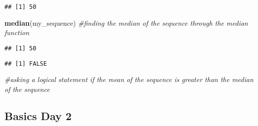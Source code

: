 \documentclass[]{article}
\newenvironment{Shaded}{\begin{snugshade}}{\end{snugshade}}
\newcommand{\CommentTok}[1]{\textcolor[rgb]{0.56,0.35,0.01}{\textit{#1}}}
\newcommand{\DataTypeTok}[1]{\textcolor[rgb]{0.13,0.29,0.53}{#1}}
\newcommand{\DecValTok}[1]{\textcolor[rgb]{0.00,0.00,0.81}{#1}}
\newcommand{\KeywordTok}[1]{\textcolor[rgb]{0.13,0.29,0.53}{\textbf{#1}}}
\newcommand{\NormalTok}[1]{#1}
\newcommand{\OperatorTok}[1]{\textcolor[rgb]{0.81,0.36,0.00}{\textbf{#1}}}
\newcommand{\StringTok}[1]{\textcolor[rgb]{0.31,0.60,0.02}{#1}}
\begin{document}
\begin{Shaded}
\end{Shaded}

\begin{verbatim}
## [1] 50
\end{verbatim}

\begin{Shaded}
\begin{Highlighting}[]
   \KeywordTok{median}\NormalTok{(my_sequence) }\CommentTok{#finding the median of the sequence through the median function}
\end{Highlighting}
\end{Shaded}

\begin{verbatim}
## [1] 50
\end{verbatim}

\begin{Shaded}
\end{Shaded}

\begin{verbatim}
## [1] FALSE
\end{verbatim}

\begin{Shaded}
\begin{Highlighting}[]
   \CommentTok{#asking a logical statement if the mean of the sequence is greater than the median of the sequence}
\end{Highlighting}
\end{Shaded}

\hypertarget{basics-day-2}{%
\subsection{Basics Day 2}\label{basics-day-2}}
\end{document}
